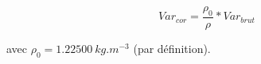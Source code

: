 \[
Var_{cor} = \frac{\rho_0}{\rho} * Var_{brut}
\]

avec $\rho_0 = 1.22500\ kg.m^{-3}$ (par d\'efinition).

